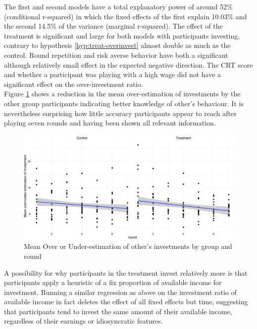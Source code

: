 The first and second models have a total explanatory power of around 52\% (conditional r-squared) in which the fixed effects of the first explain 10.03\% and the second 14.5\% of the variance (marginal r-squared). The effect of the treatment is significant and large for both models with participants investing, contrary to hypothesis \ref{hyp:treat-overinvest} almost double as much as the control. Round repetition and risk averse behavior have both a significant although relatively small effect in the expected negative direction. The CRT score and whether a participant was playing with a high wage did not have a significant effect on the over-investment ratio.\\

Figure \ref{fig:beliefs_smooth} shows a reduction in the mean over-estimation of investments by the other group participants indicating better knowledge of other's behaviour. It is nevertheless surprising how little accuracy participants appear to reach after playing seven rounds and having been shown all relevant information.\\

\begin{figure}
    \centering
    \includegraphics[width=\textwidth]{graphs/beliefs_smooth_lm.png}
    \caption{Mean Over or Under-estimation of other's investments by group and round}
    \label{fig:beliefs_smooth}
\end{figure}

A possibility for why participants in the treatment invest relatively more is that participants apply a heuristic of a fix proportion of available income for investment. Running a similar regression as above on the investment ratio of available income in fact deletes the effect of all fixed effects but time, suggesting that participants tend to invest the same amount of their available income, regardless of their earnings or idiosyncratic features.\\


